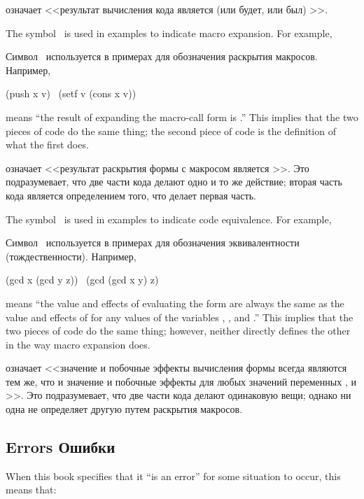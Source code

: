 означает <<результат вычисления кода  является (или будет, или был) >>.

The symbol \EX\ is used in examples to indicate macro expansion.
For example,

Символ \EX\ используется в примерах для обозначения раскрытия макросов.
Например,
\begin{lisp}
(push x v) \EX\ (setf v (cons x v))
\end{lisp}
means ``the result of expanding the macro-call form 
is .''  This implies that the two pieces
of code do the same thing; the second piece of code is
the definition of what the first does.

означает <<результат раскрытия формы с макросом 
является >>. Это подразумевает, что две части кода
делают одно и то же действие; вторая часть кода является определением того, что
делает первая часть.

The symbol \EQ\ is used in examples to indicate code equivalence.
For example,

Символ \EQ\ используется в примерах для обозначения эквивалентности
(тождественности).
Например,
\begin{lisp}
(gcd x (gcd y z)) \EQ\ (gcd (gcd x y) z)
\end{lisp}
means ``the value and effects of evaluating the form
 are always the same as the value
and effects of
 for any values of the
variables , , and .''
This implies that the two pieces
of code do the same thing; however, neither directly defines
the other in the way macro expansion does.

означает <<значение и побочные эффекты вычисления формы  всегда
являются тем же, что и значение и побочные эффекты  для любых
значений переменных ,  и >>.
Это подразумевает, что две части кода делают одинаковую вещи; однако ни одна не
определяет другую путем раскрытия макросов.

\subsection{Errors Ошибки}
\label{INTRO-ERRORS}

When this book specifies that it ``is an error'' for some situation
to occur, this means that:

